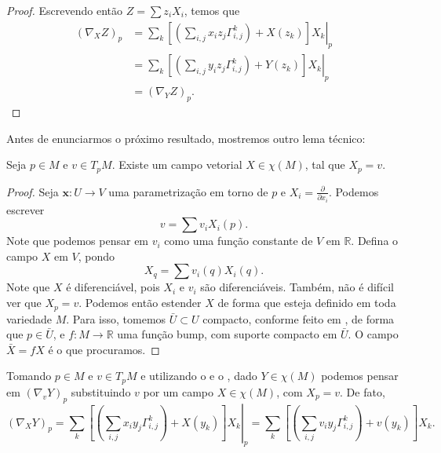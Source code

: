 \begin{lemma}
\begin{proof}
        Escrevendo então $Z=\sum z_{i}X_{i}$, temos que
        \begin{align*}
            (\nabla_{X}Z)_{p} & = \left.\sum_{k}\left[\left( \sum_{i,j}x_{i}z_{j}\Gamma_{i,j}^{k} \right)+X(z_{k})\right]X_{k}\right|_{p} \\
                              & =\left.\sum_{k}\left[\left( \sum_{i,j}y_{i}z_{j}\Gamma_{i,j}^{k} \right)+Y(z_{k})\right]X_{k}\right|_{p}  \\
                              & = (\nabla_{Y}Z)_{p}.
        \end{align*}
    \end{proof}
\end{lemma}
Antes de enunciarmos o próximo resultado, mostremos outro lema técnico:
\begin{lemma}
    \label{loc:lema_:_todo_vetor_pode_ser_estendido_a_um_campo.lema}
    Seja $p \in M$ e $v \in T_{p}M$. Existe um campo vetorial $X \in \chi (M)$, tal que $X_{p}=v$.
    \begin{proof}

        Seja $\mathbf{x}:U\to V$ uma parametrização em torno de $p$ e $X_{i}=\frac{\partial}{\partial x_{i}}$. Podemos escrever
        \begin{equation*}
            v=\sum v_{i}X_{i}(p).
        \end{equation*}
        Note que podemos pensar em $v_{i}$ como uma função constante de $V$ em $\mathbb{R}$.
        Defina o campo $X$ em $V$, pondo
        \begin{equation*}
            X_{q}=\sum v_{i}(q)X_{i}(q).
        \end{equation*}
        Note que $X$ é diferenciável, pois $X_{i}$ e $v_{i}$ são diferenciáveis. Também, não é difícil ver que $X_{p}=v$.
        Podemos então estender $X$ de forma que esteja definido em toda variedade $M$. Para isso, tomemos $\bar{U}\subset U$ compacto, conforme feito em , de forma que $p \in \bar{U}$, e $f:M\to \mathbb{R}$ uma função bump, com suporte compacto em $\bar{U}$. O campo $\bar{X}={f}X$ é o que procuramos.
    \end{proof}
\end{lemma}
Tomando $p \in M$ e $v \in T_{p}M$ e utilizando o  e o , dado $Y \in \chi(M)$ podemos pensar em $(\nabla_{v}Y)_{p}$ substituindo $v$ por um campo $X \in \chi(M)$, com $X_{p}=v$. De fato,
\begin{equation*}
    (\nabla_{X}Y)_{p} = \left.\sum_{k}\left[\left( \sum_{i,j}x_{i}y_{j}\Gamma_{i,j}^{k} \right)+X(y_{k})\right]X_{k}\right|_{p} = \sum_{k}\left[\left( \sum_{i,j}v_{i}y_{j}\Gamma_{i,j}^{k} \right)+v(y_{k})\right]X_{k}.
\end{equation*}
